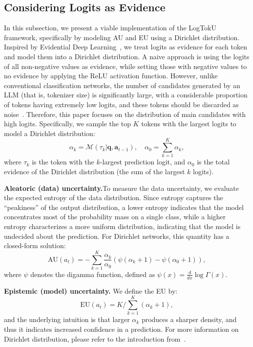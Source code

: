  
\subsection{Considering Logits as Evidence}
In this subsection, we present a viable implementation of the LogTokU framework, specifically by modeling AU and EU using a Dirichlet distribution. Inspired by Evidential Deep Learning~\cite{sensoy2018evidential}, we treat logits as evidence for each token and model them into a Dirichlet distribution. A naive approach is using the logits of all non-negative values as evidence, while setting those with negative values to no evidence by applying the ReLU activation function. However, unlike conventional classification networks, the number of candidates generated by an LLM (that is, tokenizer size) is significantly large, with a considerable proportion of tokens having extremely low logits, and these tokens should be discarded as noise~\cite{tang2024top}. Therefore, this paper focuses on the distribution of main candidates with high logits. Specifically, we sample the top $K$ tokens with the largest logits to model a Dirichlet distribution:
\begin{equation}
    \alpha_k=\mathcal{M}({{\tau_k}}|\bm{q},\bm{a}_{t-1}), \quad \alpha_{0}=\sum_{k=1}^{K}\alpha_k,
    \label{eq:evidence}
\end{equation}
where \(\tau_{k}\) is the token with the $k$-largest prediction logit, and $\alpha_0$ is the total evidence of the Dirichlet distribution (the sum of the largest $k$ logits).

\textbf{Aleatoric (data) uncertainty.}\quad To measure the data uncertainty, we evaluate the expected entropy of the data distribution. Since entropy captures the ``peakiness'' of the output distribution, a lower entropy indicates that the model concentrates most of the probability mass on a single class, while a higher entropy characterizes a more uniform distribution, indicating that the model is undecided about the prediction. For Dirichlet networks, this quantity has a closed-form solution:
\begin{equation}
    \text{AU}(a_t) = - \sum_{k=1}^K\frac{\alpha_k}{\alpha_0}\left(\psi(\alpha_k+1) -  \psi(\alpha_0+1)\right), 
\end{equation}
where $\psi$ denotes the digamma function, defined as $\psi(x) = \frac{d}{d x} \log \Gamma(x)$. 

\textbf{Epistemic (model) uncertainty.}\quad 
We define the EU by:
\begin{equation}
    \text{EU}(a_t) = K / \sum_{k=1}^K (\alpha_k + 1),\label{eq:eu}
\end{equation}
and the underlying intuition is that larger $\alpha_k$ produces a sharper density, and thus it indicates increased confidence in a prediction. For more information on Dirichlet distribution, please refer to the introduction from~\cite{ulmer2023prior}.


